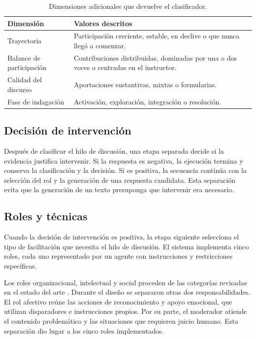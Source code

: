\begin{table}[htbp]
\centering
\small
\renewcommand{\arraystretch}{1.12}
\begin{tabularx}{\textwidth}{@{}Z{3.2cm}Y@{}}
\toprule
\textbf{Dimensión} & \textbf{Valores descritos} \\
\midrule
Trayectoria & Participación creciente, estable, en declive o que nunca llegó a comenzar. \\
Balance de participación & Contribuciones distribuidas, dominadas por una o dos voces o centradas en el instructor. \\
Calidad del discurso & Aportaciones sustantivas, mixtas o formularias. \\
Fase de indagación & Activación, exploración, integración o resolución. \\
\bottomrule
\end{tabularx}
\caption{Dimensiones adicionales que devuelve el clasificador.}
\label{tab:dimensiones-clasificacion}
\end{table}

\subsection{Decisión de intervención}

Después de clasificar el hilo de discusión, una etapa separada decide si la evidencia justifica intervenir. Si la respuesta es negativa, la ejecución termina y conserva la clasificación y la decisión. Si es positiva, la secuencia continúa con la selección del rol y la generación de una respuesta candidata. Esta separación evita que la generación de un texto presuponga que intervenir era necesario.

\subsection{Roles y técnicas}

Cuando la decisión de intervención es positiva, la etapa siguiente selecciona el tipo de facilitación que necesita el hilo de discusión. El sistema implementa cinco roles, cada uno representado por un agente con instrucciones y restricciones específicas.

Los roles organizacional, intelectual y social proceden de las categorías revisadas en el estado del arte \parencite{Paulsen1995,Abdous2011}. Durante el diseño se separaron otras dos responsabilidades. El rol afectivo reúne las acciones de reconocimiento y apoyo emocional, que utilizan disparadores e instrucciones propios. Por su parte, el moderador atiende el contenido problemático y las situaciones que requieren juicio humano. Esta separación dio lugar a los cinco roles implementados.

